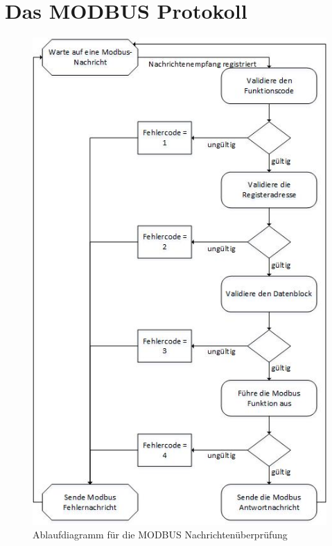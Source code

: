 \chapter{Das MODBUS Protokoll}
\begin{figure}[h]
\centering
\includegraphics[scale=0.65]{modbus/modbustransdiag}
\caption{Ablaufdiagramm für die MODBUS Nachrichtenüberprüfung}
\label{fig:modbustransdiag}
\end{figure}
\newpage
